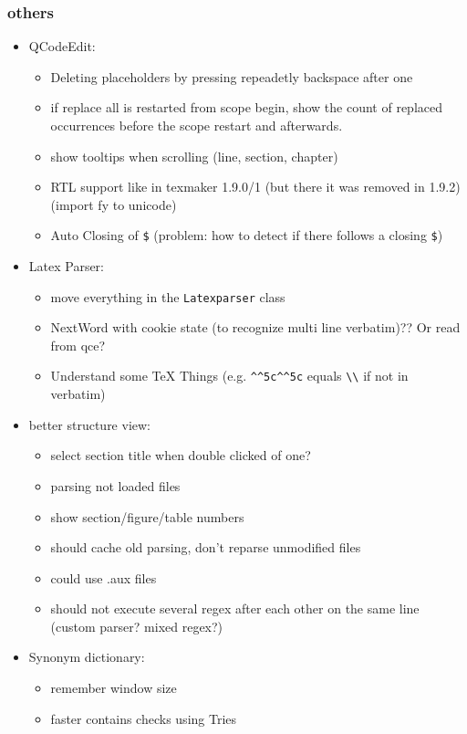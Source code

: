 \documentclass[10pt,a4paper,landscape]{report}
\begin{document}
\subsubsection{others}
\begin{itemize}
	\item QCodeEdit: \begin{itemize}
		\item Deleting placeholders by pressing repeadetly backspace after one
		\item if replace all is restarted from scope begin, show the count of replaced occurrences before the scope restart and afterwards.
		\item show tooltips when scrolling (line, section, chapter)
		\item RTL support like in texmaker 1.9.0/1 (but there it was removed in 1.9.2) (import fy to unicode)
		\item Auto Closing of \verb+$+ (problem: how to detect if there follows a closing \verb+$+)
	\end{itemize}
	\item Latex Parser: \begin{itemize}
		\item move everything in the \verb+Latexparser+ class
		\item NextWord with cookie state (to recognize multi line verbatim)?? Or read from qce?
		\item Understand some TeX Things (e.g. \verb+^^5c^^5c+ equals \verb+\\+ if not in verbatim)
	\end{itemize}
	\item better structure view: \begin{itemize}
		\item select section title when double clicked of one?		
		\item parsing not loaded files
		\item show section/figure/table numbers
		\item should cache old parsing, don't reparse unmodified files
		\item could use .aux files
		\item should not execute several regex after each other on the same line (custom parser? mixed regex?)	
	\end{itemize}
	\item Synonym dictionary: \begin{itemize}
		\item remember window size
		\item faster contains checks using Tries

\end{itemize}
\end{itemize}
\end{document}
